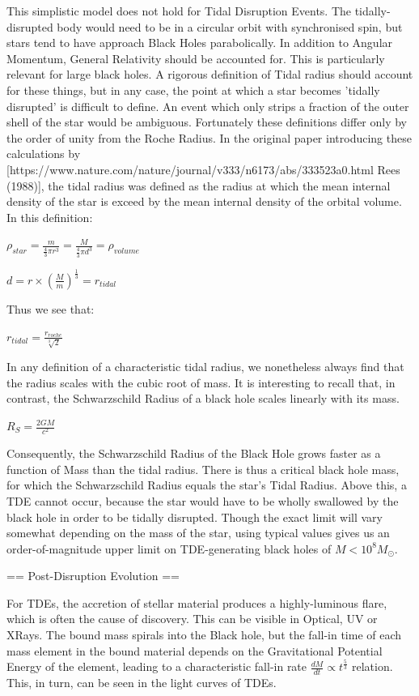 This simplistic model does not hold for Tidal Disruption Events. The tidally-disrupted body would need to be in a circular orbit with synchronised spin, but stars tend to have approach Black Holes parabolically. In addition to Angular Momentum, General Relativity should be accounted for. This is particularly relevant for large black holes. A rigorous definition of Tidal radius should account for these things, but in any case, the point at which a star becomes 'tidally disrupted' is difficult to define. An event which only strips a fraction of the outer shell of the star would be ambiguous. Fortunately these definitions differ only by the order of unity from the Roche Radius. In the original paper introducing these calculations by [https://www.nature.com/nature/journal/v333/n6173/abs/333523a0.html Rees (1988)], the tidal radius was defined as the radius at which the mean internal density of the star is exceed by the mean internal density of the orbital volume. In this definition:

$\rho_{star} = \frac{m}{\frac{4}{3} \pi r ^{3}}  = \frac{M}{\frac{4}{3} \pi d ^{3}}= \rho_{volume}$

$ d = r \times (\frac{M}{m})^{\frac{1}{3}} = r_{tidal} $

Thus we see that:

$ r_{tidal} = \frac{r_{roche}}{\sqrt[3]{2}} $

In any definition of a characteristic tidal radius, we nonetheless always find that the radius scales with the cubic root of mass. It is interesting to recall that, in contrast, the Schwarzschild Radius of a black hole scales linearly with its mass. 

$R_{S} = \frac{2GM}{c^{2}}$

Consequently, the Schwarzschild Radius of the Black Hole grows faster as a function of Mass than the tidal radius. There is thus a critical black hole mass, for which the Schwarzschild Radius equals the star's Tidal Radius. Above this, a TDE cannot occur, because the star would have to be wholly swallowed by the black hole in order to be tidally disrupted. Though the exact limit will vary somewhat depending on the mass of the star, using typical values gives us an order-of-magnitude upper limit on TDE-generating black holes of $M < 10^{8} M_{\odot}$.

== Post-Disruption Evolution ==

For TDEs, the accretion of stellar material produces a highly-luminous flare, which is often the cause of discovery. This can be visible in Optical, UV or XRays. The bound mass spirals into the Black hole, but the fall-in time of each mass element in the bound material depends on the Gravitational Potential Energy of the element, leading to a characteristic fall-in rate $ \frac{dM}{dt} \propto t^{\frac{5}{3}}$ relation. This, in turn, can be seen in the light curves of TDEs.

